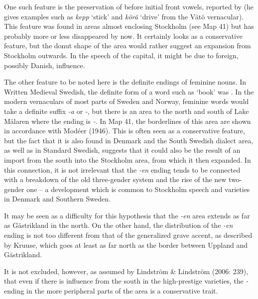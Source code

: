 One such feature is the preservation of  before initial front vowels, reported by \citet{Kruuse1908} (he gives examples such as \textit{kepp} ‘stick’ and \textit{körä} ‘drive’ from the Vätö vernacular). This feature was found in areas almost enclosing Stockholm (see Map 41) but has probably more or less disappeared by now. It certainly looks as a conservative feature, but the donut shape of the area would rather suggest an expansion from Stockholm outwards. In the speech of the capital, it might be due to foreign, possibly Danish, influence.




The other feature to be noted here is the definite endings of feminine nouns. In Written Medieval Swedish, the definite form of a word such as  ‘book’ was . In the modern vernaculars of most parts of Sweden and Norway, feminine words would take a definite suffix\textit{ {}-a} or\textit{ {}-}, but there is an area to the north and south of Lake Mälaren where the ending is\textit{ {}-}. In Map 41, the borderlines of this area are shown in accordance with Modéer (1946). This is often seen as a conservative feature, but the fact that it is also found in Denmark and the South Swedish dialect area, as well as in Standard Swedish, suggests that it could also be the result of an import from the south into the Stockholm area, from which it then expanded. In this connection, it is not irrelevant that the \textit{{}-en} ending tends to be connected with a breakdown of the old three-gender system and the rise of the new two-gender one – a development which is common to Stockholm speech and varieties in Denmark and Southern Sweden.




It may be seen as a difficulty for this hypothesis that the \textit{{}-en} area extends as far as Gästrikland in the north. On the other hand, the distribution of the \textit{{}-}\textit{en} ending is not too different from that of the generalized grave accent, as described by Kruuse, which goes at least as far north as the border between Uppland and Gästrikland.




It is not excluded, however, as assumed by Lindström \& Lindström (2006: 239), that even if there is influence from the south in the high-prestige varieties, the\textit{ {}-} ending in the more peripheral parts of the area is a conservative trait.




